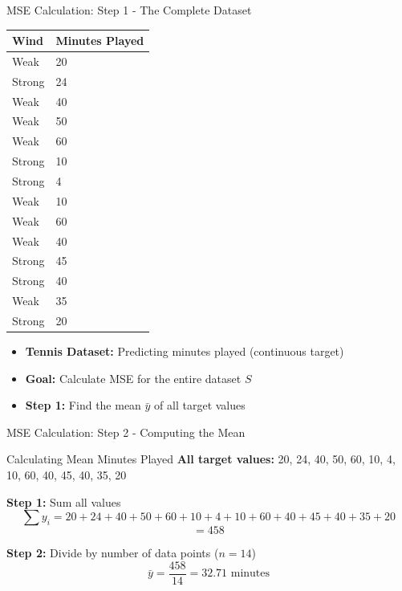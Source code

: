 \documentclass[usenames,dvipsnames]{beamer}
\begin{document}
\begin{frame}{MSE Calculation: Step 1 - The Complete Dataset}
\begin{center}
\begin{table}[]
	\begin{tabular}{@{}ll@{}}
		\toprule
		\textbf{Wind} & \textbf{Minutes Played} \\ \midrule
		Weak          & 20                      \\
		Strong        & 24                      \\
		Weak          & 40                      \\
		Weak          & 50                      \\
		Weak          & 60                      \\
		Strong        & 10                      \\
		Strong        & 4                       \\
		Weak          & 10                      \\
		Weak          & 60                      \\
		Weak          & 40                      \\
		Strong        & 45                      \\
		Strong        & 40                      \\
		Weak          & 35                      \\
		Strong        & 20                      \\ \bottomrule
	\end{tabular}
\end{table}
\end{center}

\begin{itemize}
	\item \textbf{Tennis Dataset:} Predicting minutes played (continuous target)
	\item \textbf{Goal:} Calculate MSE for the entire dataset $S$
	\item \textbf{Step 1:} Find the mean $\bar{y}$ of all target values
\end{itemize}
\end{frame}

\begin{frame}{MSE Calculation: Step 2 - Computing the Mean}
\begin{examplebox}{Calculating Mean Minutes Played}
\textbf{All target values:} 20, 24, 40, 50, 60, 10, 4, 10, 60, 40, 45, 40, 35, 20

\vspace{0.3cm}
\textbf{Step 1:} Sum all values
\[
\sum y_i = 20 + 24 + 40 + 50 + 60 + 10 + 4 + 10 + 60 + 40 + 45 + 40 + 35 + 20
\]
\pause
\[
= 458
\]

\pause
\textbf{Step 2:} Divide by number of data points ($n = 14$)
\[
\bar{y} = \frac{458}{14} = 32.71 \text{ minutes}
\]
\end{examplebox}
\end{frame}
\end{document}
